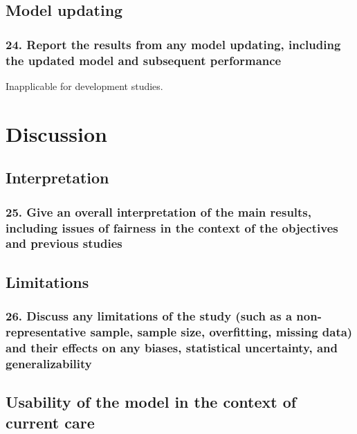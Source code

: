 \documentclass[
  letterpaper,
  DIV=11,
  numbers=noendperiod]{scrartcl}
\begin{document}
\subsection{Model updating}\label{model-updating}

\subsubsection{24. Report the results from any model updating, including
the updated model and subsequent
performance}\label{report-the-results-from-any-model-updating-including-the-updated-model-and-subsequent-performance}

Inapplicable for development studies.

\section{Discussion}\label{discussion}

\subsection{Interpretation}\label{interpretation}

\subsubsection{25. Give an overall interpretation of the main results,
including issues of fairness in the context of the objectives and
previous
studies}\label{give-an-overall-interpretation-of-the-main-results-including-issues-of-fairness-in-the-context-of-the-objectives-and-previous-studies}

\subsection{Limitations}\label{limitations}

\subsubsection{26. Discuss any limitations of the study (such as a
non-representative sample, sample size, overfitting, missing data) and
their effects on any biases, statistical uncertainty, and
generalizability}\label{discuss-any-limitations-of-the-study-such-as-a-non-representative-sample-sample-size-overfitting-missing-data-and-their-effects-on-any-biases-statistical-uncertainty-and-generalizability}

\subsection{Usability of the model in the context of current
care}\label{usability-of-the-model-in-the-context-of-current-care}
\end{document}
